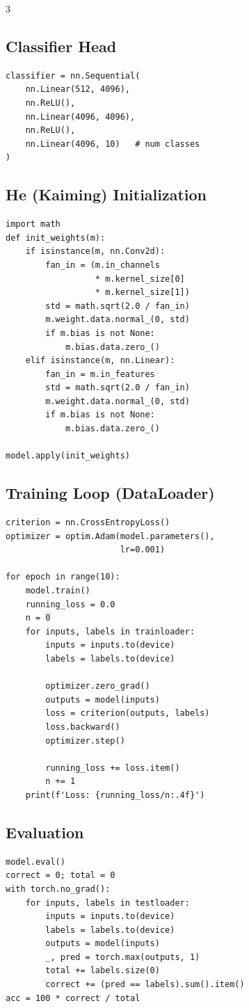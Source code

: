\documentclass[6pt,landscape,a4paper]{extarticle}
\begin{document}
\begin{multicols}{3}
\subsection{Classifier Head}
\begin{lstlisting}
classifier = nn.Sequential(
    nn.Linear(512, 4096),
    nn.ReLU(),
    nn.Linear(4096, 4096),
    nn.ReLU(),
    nn.Linear(4096, 10)   # num classes
)
\end{lstlisting}

\subsection{He (Kaiming) Initialization}
\begin{lstlisting}
import math
def init_weights(m):
    if isinstance(m, nn.Conv2d):
        fan_in = (m.in_channels
                  * m.kernel_size[0]
                  * m.kernel_size[1])
        std = math.sqrt(2.0 / fan_in)
        m.weight.data.normal_(0, std)
        if m.bias is not None:
            m.bias.data.zero_()
    elif isinstance(m, nn.Linear):
        fan_in = m.in_features
        std = math.sqrt(2.0 / fan_in)
        m.weight.data.normal_(0, std)
        if m.bias is not None:
            m.bias.data.zero_()

model.apply(init_weights)
\end{lstlisting}

\subsection{Training Loop (DataLoader)}
\begin{lstlisting}
criterion = nn.CrossEntropyLoss()
optimizer = optim.Adam(model.parameters(),
                       lr=0.001)

for epoch in range(10):
    model.train()
    running_loss = 0.0
    n = 0
    for inputs, labels in trainloader:
        inputs = inputs.to(device)
        labels = labels.to(device)

        optimizer.zero_grad()
        outputs = model(inputs)
        loss = criterion(outputs, labels)
        loss.backward()
        optimizer.step()

        running_loss += loss.item()
        n += 1
    print(f'Loss: {running_loss/n:.4f}')
\end{lstlisting}

\subsection{Evaluation}
\begin{lstlisting}
model.eval()
correct = 0; total = 0
with torch.no_grad():
    for inputs, labels in testloader:
        inputs = inputs.to(device)
        labels = labels.to(device)
        outputs = model(inputs)
        _, pred = torch.max(outputs, 1)
        total += labels.size(0)
        correct += (pred == labels).sum().item()
acc = 100 * correct / total
\end{lstlisting}


\end{multicols}
\end{document}
